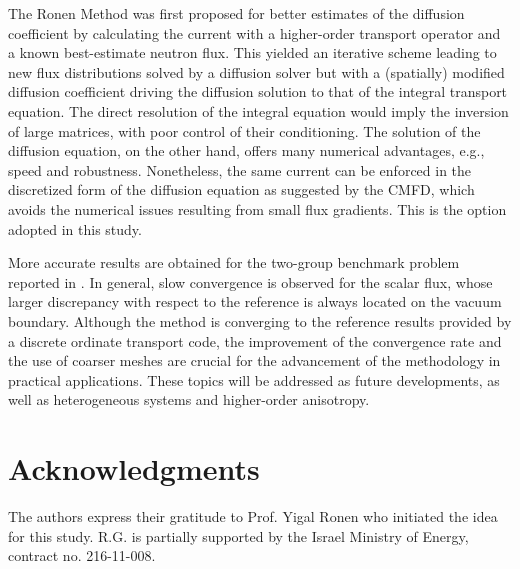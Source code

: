 The Ronen Method was first proposed for better estimates of the diffusion coefficient by calculating the current with a higher-order transport operator and a known best-estimate neutron flux. This yielded an iterative scheme leading to new flux distributions solved by a diffusion solver but with a (spatially) modified diffusion coefficient driving the diffusion solution to that of the integral transport equation. The direct resolution of the integral equation would imply the inversion of large matrices, with poor control of their conditioning. The solution of the diffusion equation, on the other hand, offers many numerical advantages, e.g., speed and robustness. Nonetheless, the same current can be enforced in the discretized form of the diffusion equation as suggested by the CMFD, which avoids the numerical issues resulting from small flux gradients. This is the option adopted in this study.  

More accurate results are obtained for the two-group benchmark problem reported in \cite{Tomatis-2011}. In general, slow convergence is observed for the scalar flux, whose larger discrepancy with respect to the reference is always located on the vacuum boundary. Although the method is converging to the reference results provided by a discrete ordinate transport code, the improvement of the convergence rate and the use of coarser meshes are crucial for the advancement of the methodology in practical applications. These topics will be addressed as future developments, as well as heterogeneous systems and higher-order anisotropy.

%
\section*{Acknowledgments}
\label{sec:acknow}

The authors express their gratitude to Prof. Yigal Ronen who initiated the idea for this study. R.G. is partially supported by the Israel Ministry of Energy, contract no. 216-11-008. 


	

%







